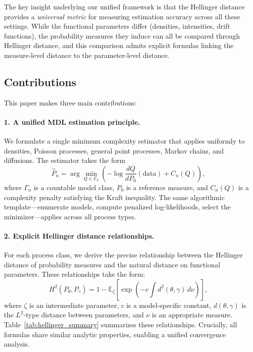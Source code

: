 \documentclass[preprint,review,12pt]{article}
\begin{document}
The key insight underlying our unified framework is that the Hellinger 
distance provides a \emph{universal metric} for measuring estimation accuracy 
across all these settings. While the functional parameters differ (densities, 
intensities, drift functions), the probability measures they induce can all 
be compared through Hellinger distance, and this comparison admits explicit 
formulas linking the measure-level distance to the parameter-level distance.

\subsection{Contributions}

This paper makes three main contributions:

\paragraph{1. A unified MDL estimation principle.}
We formulate a single minimum complexity estimator that applies uniformly to 
densities, Poisson processes, general point processes, Markov chains, and 
diffusions. The estimator takes the form
\begin{equation}\label{eq:unified_estimator}
	\hat{P}_n = \arg\min_{Q \in \Gamma_n} \left( -\log \frac{dQ}{dP_0}
	(\text{data}) + C_n(Q) \right),
\end{equation}
where $\Gamma_n$ is a countable model class, $P_0$ is a reference measure, 
and $C_n(Q)$ is a complexity penalty satisfying the Kraft inequality. The 
same algorithmic template---enumerate models, compute penalized 
log-likelihoods, select the minimizer---applies across all process types.

\paragraph{2. Explicit Hellinger distance relationships.}
For each process class, we derive the precise relationship between the 
Hellinger distance of probability measures and the natural distance on 
functional parameters. These relationships take the form:
\begin{equation}\label{eq:hellinger_template}
	H^2(P_\theta, P_\gamma) = 1 - \mathbb{E}_\zeta\left[ 
	\exp\left( -c \int d^2(\theta, \gamma) \, d\nu \right) \right],
\end{equation}
where $\zeta$ is an intermediate parameter, $c$ is a model-specific constant, 
$d(\theta, \gamma)$ is the $L^2$-type distance between parameters, and $\nu$ 
is an appropriate measure. Table~\ref{tab:hellinger_summary} summarizes these 
relationships. Crucially, all formulas share similar analytic properties, 
enabling a unified convergence analysis.
\end{document}
